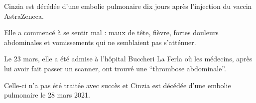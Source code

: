 Cinzia est décédée d'une embolie pulmonaire dix jours après l'injection du
vaccin AstraZeneca.

Elle a commencé à se sentir mal : maux de tête, fièvre, fortes douleurs
abdominales et vomissements qui ne semblaient pas s'atténuer.

Le 23 mars, elle a été admise à l'hôpital Buccheri La Ferla où les médecins,
après lui avoir fait passer un scanner, ont trouvé une “thrombose abdominale”.

Celle-ci n'a pas été traitée avec succès et Cinzia est décédée d'une embolie
pulmonaire le 28 mars 2021.

